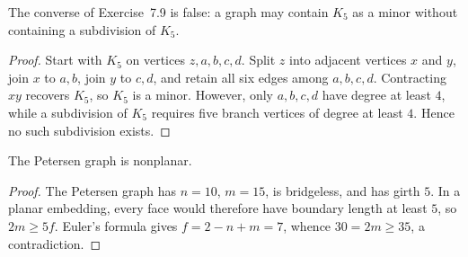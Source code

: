 \begin{noteexercise}
The converse of Exercise~7.9 is false: a graph may contain $K_5$ as a minor
without containing a subdivision of $K_5$.
\end{noteexercise}
\begin{proof}
Start with $K_5$ on vertices $z,a,b,c,d$.  Split $z$ into adjacent vertices
$x$ and $y$, join $x$ to $a,b$, join $y$ to $c,d$, and retain all six edges
among $a,b,c,d$.  Contracting $xy$ recovers $K_5$, so $K_5$ is a minor.
However, only $a,b,c,d$ have degree at least $4$, while a subdivision of
$K_5$ requires five branch vertices of degree at least $4$.  Hence no such
subdivision exists.
\end{proof}

\begin{noteexercise}
The Petersen graph is nonplanar.
\end{noteexercise}
\begin{proof}
The Petersen graph has $n=10$, $m=15$, is bridgeless, and has girth $5$.  In a planar embedding, every face would therefore have boundary length at least $5$, so $2m\ge5f$.  Euler's
formula gives $f=2-n+m=7$, whence $30=2m\ge35$, a contradiction.
\end{proof}
